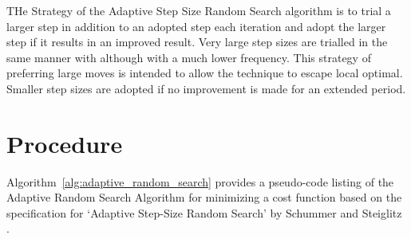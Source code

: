 \documentclass[a4paper, 11pt]{article}
\begin{document}
THe Strategy of the Adaptive Step Size Random Search algorithm is to trial a larger step in addition to an adopted step each iteration and adopt the larger step if it results in an improved result. Very large step sizes are trialled in the same manner with although with a much lower frequency. This strategy of preferring large moves is intended to allow the technique to escape local optimal. Smaller step sizes are adopted if no improvement is made for an extended period. 

\section{Procedure}
\label{sec:procedure}
Algorithm~\ref{alg:adaptive_random_search} provides a pseudo-code listing of the Adaptive Random Search Algorithm for minimizing a cost function based on the specification for `Adaptive Step-Size Random Search' by Schummer and Steiglitz \cite{Schumer1968}.
\end{document}
